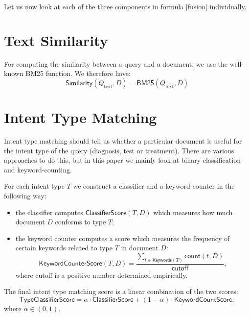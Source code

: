 Let us now look at each of the three components in formula \ref{fusion} individually.

\section{Text Similarity}
For computing the similarity between a query and a document, we use the well-known BM25\cite{bm25} function. We therefore have:
\begin{equation}\label{bm25-formula}
 \textsf{Similarity}(Q_{\text{text}}, D) = \textsf{BM25}(Q_{\text{text}},D)%
\end{equation}


\section{Intent Type Matching}
Intent type matching should tell us whether a particular document is useful for the intent type of the query 
(diagnosis, test or treatment). There are various approaches to do this, but in this paper we mainly look at
binary classification and keyword-counting.

For each intent type $T$ we construct a classifier and a keyword-counter in the following way:
\begin{itemize}
 \item the classifier computes $\textsf{ClassifierScore}(T,D)$ which measures how much document $D$ conforms to type $T$;
 \item the keyword counter computes a score which measures the frequency of certain keywords related to type $T$ in document $D$:
 \begin{equation}\label{basic-formula}
  \textsf{KeywordCounterScore}(T,D) = \displaystyle\frac{\displaystyle\sum_{t\in \textsf{Keywords}(T)} \textsf{count}(t,D)}{\textsf{cutoff}},
 \end{equation}
  where \textsf{cutoff} is a positive number determined empirically.
\end{itemize}

The final intent type matching score is a linear combination of the two scores:
\begin{equation}\label{clf-combine-formula}
 \textsf{TypeClassifierScore} = \alpha\cdot\textsf{ClassifierScore} + (1-\alpha)\cdot\textsf{KeywordCountScore},
\end{equation}
where $\alpha\in (0,1)$.

